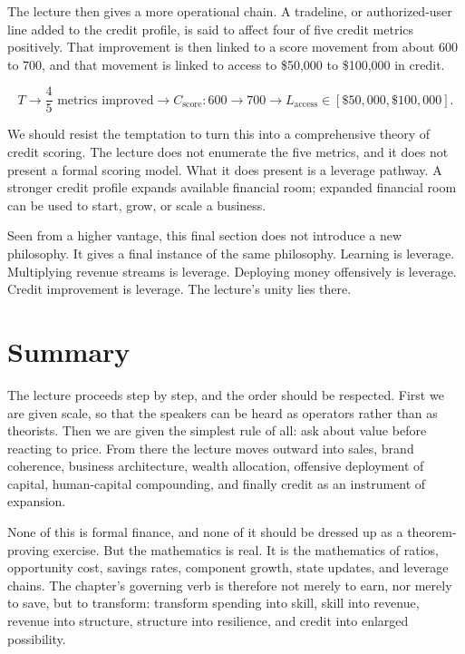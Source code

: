 The lecture then gives a more operational chain. A tradeline, or authorized-user line added to the credit profile, is said to affect four of five credit metrics positively. That improvement is then linked to a score movement from about \(600\) to \(700\), and that movement is linked to access to \$50{,}000 to \$100{,}000 in credit.

\begin{equation}
T
\longrightarrow
\frac{4}{5}\text{ metrics improved}
\longrightarrow
C_{\text{score}}:600\to700
\longrightarrow
L_{\text{access}}\in[\$50{,}000,\$100{,}000].
\end{equation}

We should resist the temptation to turn this into a comprehensive theory of credit scoring. The lecture does not enumerate the five metrics, and it does not present a formal scoring model. What it does present is a leverage pathway. A stronger credit profile expands available financial room; expanded financial room can be used to start, grow, or scale a business.

Seen from a higher vantage, this final section does not introduce a new philosophy. It gives a final instance of the same philosophy. Learning is leverage. Multiplying revenue streams is leverage. Deploying money offensively is leverage. Credit improvement is leverage. The lecture's unity lies there.

\section{Summary}

The lecture proceeds step by step, and the order should be respected. First we are given scale, so that the speakers can be heard as operators rather than as theorists. Then we are given the simplest rule of all: ask about value before reacting to price. From there the lecture moves outward into sales, brand coherence, business architecture, wealth allocation, offensive deployment of capital, human-capital compounding, and finally credit as an instrument of expansion.

None of this is formal finance, and none of it should be dressed up as a theorem-proving exercise. But the mathematics is real. It is the mathematics of ratios, opportunity cost, savings rates, component growth, state updates, and leverage chains. The chapter's governing verb is therefore not merely to earn, nor merely to save, but to transform: transform spending into skill, skill into revenue, revenue into structure, structure into resilience, and credit into enlarged possibility.